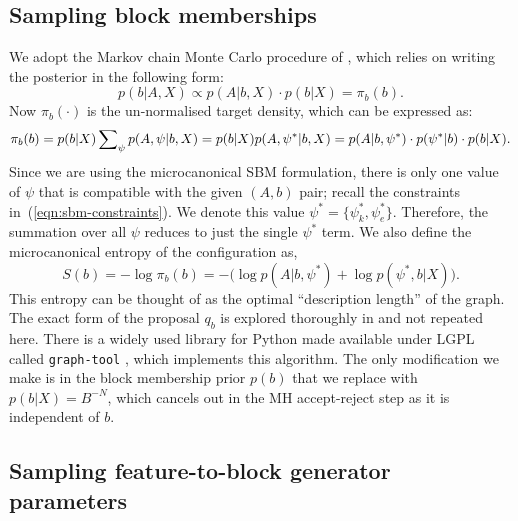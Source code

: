 \FloatBarrier
\clearpage
\subsection{Sampling block memberships}

We adopt the Markov chain Monte Carlo procedure of
\cite{Peixoto-MCMC},
which relies on writing the posterior in the following form:
%
\begin{equation}
	p(b | A, X) \propto p(A | b, X) \cdot p(b | X) = \pi_b(b).
\end{equation}
%
Now $\pi_b(\cdot)$ is the un-normalised target density,
which can be expressed as:
%
\begin{equation}
	\pi_b(b) = p(b|X) \sum_{\psi} \nolimits p(A , \psi | b, X) \\
	= p(b|X) p(A, \psi^* | b, X) \\
	= p(A | b, \psi^*) \cdot p(\psi^* | b) \cdot p(b | X).
\end{equation}
%
Since we are using the microcanonical SBM formulation, there is only one 
value of $\psi$ that is compatible with the given $(A, b)$ pair;
recall the constraints in~(\ref{eqn:sbm-constraints}). 
We denote this value $\psi^* = \{\psi_k^*, \psi_e^*\}$. Therefore, 
the summation over all $\psi$ reduces to just the single $\psi^*$ term.
We also define the microcanonical entropy of the configuration as,
%
\begin{equation}
	S(b) = - \log \pi_b(b) = - \Big( \log p(A | b, \psi^*) + \log p(\psi^*, b | X) \Big).
	\label{eqn:dl-form}
\end{equation}
%
This entropy can be thought of as the optimal
``description length'' of the graph. 
The exact form of the proposal $q_b$ is explored thoroughly in
\cite{Peixoto-MCMC} and not repeated here. There is a widely used 
library for Python made available under LGPL 
called \verb*|graph-tool| \cite{peixoto_graph-tool_2014}, 
which implements this algorithm. The only modification we make is in 
the block membership prior $p(b)$ that we replace with $p(b|X)=B^{-N}$, 
which cancels out in the MH accept-reject step as it is independent of $b$.

\subsection{Sampling feature-to-block generator parameters}
\label{s:sfb}

